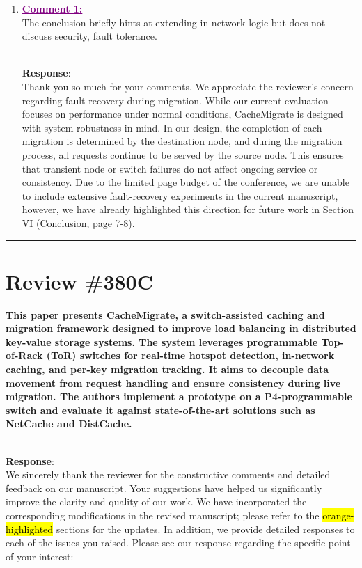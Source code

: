 \documentclass[11pt]{article}
\newcounter{reviewer}
\newcounter{point}[reviewer]
\newcommand{\reviewersection}[1]{
    \bigskip
    \hrule
    \section*{#1}
}
\newenvironment{reply}
   {\medskip \noindent \color{blue} \begin{sf}\\ \textbf{Response}:\\  }
   {\medskip \par \end{sf}}
\newcommand{\comment}[1]{\textcolor{purple}{\textbf{\underline{Comment #1:}}}\\}
\DeclareRobustCommand{\thanksfor}[1]{Thank you so much for #1}
\DeclareRobustCommand{\hlRevC}[1]{{\sethlcolor{orange}\hl{#1}}}%
\begin{document}
\begin{enumerate}
    \item \comment{1} The conclusion briefly hints at extending in-network logic but does not discuss security, fault tolerance.
          \begin{reply}
              \thanksfor{your comments}. We appreciate the reviewer's concern regarding fault recovery during migration. While our current evaluation focuses on performance under normal conditions, CacheMigrate is designed with system robustness in mind. In our design, the completion of each migration is determined by the destination node, and during the migration process, all requests continue to be served by the source node. This ensures that transient node or switch failures do not affect ongoing service or consistency. Due to the limited page budget of the conference, we are unable to include extensive fault-recovery experiments in the current manuscript, however, we have already highlighted this direction for future work in Section VI (Conclusion, page 7-8).
          \end{reply}
\end{enumerate}


\reviewersection{Review \#380C}
\textbf{This paper presents CacheMigrate, a switch-assisted caching and migration framework designed to improve load balancing in distributed key-value storage systems. The system leverages programmable Top-of-Rack (ToR) switches for real-time hotspot detection, in-network caching, and per-key migration tracking. It aims to decouple data movement from request handling and ensure consistency during live migration. The authors implement a prototype on a P4-programmable switch and evaluate it against state-of-the-art solutions such as NetCache and DistCache.}

\begin{reply}
    We sincerely thank the reviewer for the constructive comments and detailed feedback on our manuscript. Your suggestions have helped us significantly improve the clarity and quality of our work. We have incorporated the corresponding modifications in the revised manuscript; please refer to the \hlRevC{orange-highlighted} sections for the updates. In addition, we provide detailed responses to each of the issues you raised. Please see our response regarding the specific point of your interest:
\end{reply}
\end{document}
